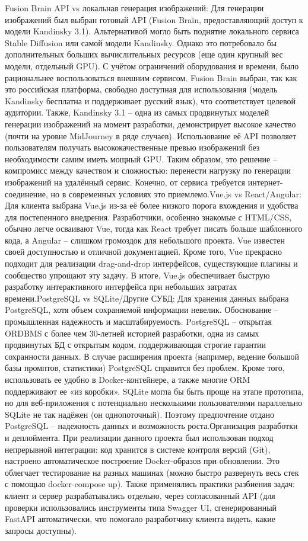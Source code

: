 Fusion Brain API vs локальная генерация изображений: Для генерации изображений был выбран готовый API (Fusion Brain, предоставляющий доступ к модели Kandinsky 3.1)\cite{sitelabs:kandinsky}. Альтернативой могло быть поднятие локального сервиса Stable Diffusion или самой модели Kandinsky. Однако это потребовало бы дополнительных больших вычислительных ресурсов (еще один крупный вес модели, отдельный GPU). С учётом ограничений оборудования и времени, было рациональнее воспользоваться внешним сервисом. Fusion Brain выбран, так как это российская платформа, свободно доступная для использования (модель Kandinsky бесплатна и поддерживает русский язык\cite{sitelabs:kandinsky}), что соответствует целевой аудитории. Также, Kandinsky 3.1 – одна из самых продвинутых моделей генерации изображений на момент разработки, демонстрирует высокое качество (почти на уровне MidJourney в ряде случаев). Использование её API позволяет пользователям получать высококачественные превью изображений без необходимости самим иметь мощный GPU. Таким образом, это решение – компромисс между качеством и сложностью: перенести нагрузку по генерации изображений на удалённый сервис. Конечно, от сервиса требуется интернет-соединение, но в современных условиях это приемлемо.Vue.js vs React/Angular: Для клиента выбрана Vue.js из-за её более низкого порога вхождения и удобства для постепенного внедрения. Разработчики, особенно знакомые с HTML/CSS, обычно легче осваивают Vue, тогда как React требует писать больше шаблонного кода, а Angular – слишком громоздок для небольшого проекта. Vue известен своей доступностью и отличной документацией\cite{vuejs:wiki}. Кроме того, Vue прекрасно подходит для реализации drag-and-drop интерфейсов, существующие плагины и сообщество упрощают эту задачу. В итоге, Vue.js обеспечивает быструю разработку интерактивного интерфейса при небольших затратах времени.PostgreSQL vs SQLite/Другие СУБД: Для хранения данных выбрана PostgreSQL, хотя объем сохраняемой информации невелик. Обоснование – промышленная надежность и масштабируемость. PostgreSQL – открытая ORDBMS с более чем 30-летней историей разработки, одна из самых продвинутых БД с открытым кодом\cite{postgresql:skillfactory}, поддерживающая строгие гарантии сохранности данных. В случае расширения проекта (например, ведение большой базы промптов, статистики) PostgreSQL справится без проблем. Кроме того, использовать ее удобно в Docker-контейнере, а также многие ORM поддерживают ее «из коробки». SQLite могла бы быть проще на этапе прототипа, но для веб-приложения с потенциально несколькими пользователями параллельно SQLite не так надёжен (он однопоточный). Поэтому предпочтение отдано PostgreSQL – надежность данных и возможность роста.Организация разработки и деплоймента. При реализации данного проекта был использован подход непрерывной интеграции: код хранится в системе контроля версий (Git), настроено автоматическое построение Docker-образов при обновлении. Это облегчает тестирование на разных машинах (можно быстро развернуть весь стек с помощью docker-compose up). Также применялись практики разбиения задач: клиент и сервер разрабатывались отдельно, через согласованный API (для проверки использовались инструменты типа Swagger UI, сгенерированный FastAPI автоматически, что помогало разработчику клиента видеть, какие запросы доступны).

